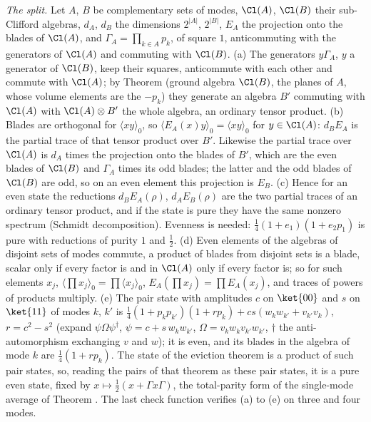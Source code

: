 \emph{The split.} Let $A$, $B$ be complementary sets of modes, $\Cl(A)$, $\Cl(B)$ their sub-Clifford algebras, $d_{A}$, $d_{B}$ the dimensions $2^{|A|}$, $2^{|B|}$, $E_{A}$ the projection onto the blades of $\Cl(A)$, and $\Gamma_{A} = \prod_{k \in A}p_{k}$, of square $1$, anticommuting with the generators of $\Cl(A)$ and commuting with $\Cl(B)$. (a) The generators $y\Gamma_{A}$, $y$ a generator of $\Cl(B)$, keep their squares, anticommute with each other and commute with $\Cl(A)$; by Theorem  (ground algebra $\Cl(B)$, the planes of $A$, whose volume elements are the $-p_{k}$) they generate an algebra $B'$ commuting with $\Cl(A)$ with $\Cl(A) \otimes B'$ the whole algebra, an ordinary tensor product. (b) Blades are orthogonal for $\langle xy\rangle_{0}$, so $\langle E_{A}(x)y\rangle_{0} = \langle xy\rangle_{0}$ for $y \in \Cl(A)$: $d_{B}E_{A}$ is the partial trace of that tensor product over $B'$. Likewise the partial trace over $\Cl(A)$ is $d_{A}$ times the projection onto the blades of $B'$, which are the even blades of $\Cl(B)$ and $\Gamma_{A}$ times its odd blades; the latter and the odd blades of $\Cl(B)$ are odd, so on an even element this projection is $E_{B}$. (c) Hence for an even state the reductions $d_{B}E_{A}(\rho)$, $d_{A}E_{B}(\rho)$ are the two partial traces of an ordinary tensor product, and if the state is pure they have the same nonzero spectrum (Schmidt decomposition). Evenness is needed: $\tfrac14(1 + e_{1})(1 + e_{2}p_{1})$ is pure with reductions of purity $1$ and $\tfrac12$. (d) Even elements of the algebras of disjoint sets of modes commute, a product of blades from disjoint sets is a blade, scalar only if every factor is and in $\Cl(A)$ only if every factor is; so for such elements $x_{j}$, $\langle\prod x_{j}\rangle_{0} = \prod\langle x_{j}\rangle_{0}$, $E_{A}(\prod x_{j}) = \prod E_{A}(x_{j})$, and traces of powers of products multiply. (e) The pair state with amplitudes $c$ on $\ket{00}$ and $s$ on $\ket{11}$ of modes $k$, $k'$ is $\tfrac14(1 + p_{k}p_{k'})(1 + rp_{k}) + cs(w_{k}w_{k'} + v_{k'}v_{k})$, $r = c^{2} - s^{2}$ (expand $\psi\Omega\psi^{\dagger}$, $\psi = c + s\,w_{k}w_{k'}$, $\Omega = v_{k}w_{k}v_{k'}w_{k'}$, $\dagger$ the anti-automorphism exchanging $v$ and $w$); it is even, and its blades in the algebra of mode $k$ are $\tfrac14(1 + rp_{k})$. The state of the eviction theorem is a product of such pair states, so, reading the pairs of that theorem as these pair states, it is a pure even state, fixed by $x \mapsto \tfrac12(x + \Gamma x\Gamma)$, the total-parity form of the single-mode average of Theorem . The last check function verifies (a) to (e) on three and four modes.

